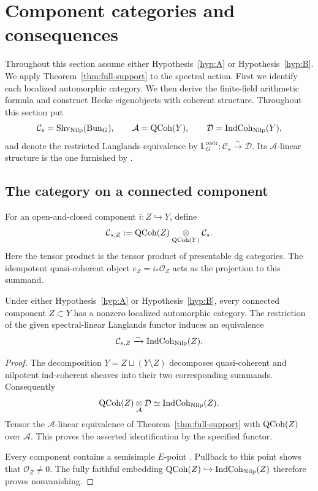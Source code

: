 \section{Component categories and consequences}
\label{sec:consequences}

Throughout this section assume either Hypothesis~\ref{hyp:A} or
Hypothesis~\ref{hyp:B}. We apply Theorem~\ref{thm:full-support} to the spectral action.
First we identify each localized automorphic category.  We then derive the
finite-field arithmetic formula and construct Hecke eigenobjects with
coherent structure.
Throughout this section put
\[
 \mathcal C_s=\operatorname{Shv}_{\operatorname{Nilp}}(\operatorname{Bun}_G),\qquad
 \mathcal A=\operatorname{QCoh}(Y),\qquad
 \mathcal D=\operatorname{IndCoh}_{\operatorname{Nilp}}(Y),
\]
and denote the restricted Langlands equivalence by
\(\mathbb L_G^{\mathrm{restr}}:\mathcal C_s\xrightarrow{\sim}\mathcal D\).
Its \(\mathcal A\)-linear structure is the one furnished by
\cite[Lemma~1.3.7]{GR}.

\subsection{The category on a connected component}

For an open-and-closed component \(i:Z\hookrightarrow Y\), define
\[
 \mathcal C_{s,Z}:=
 \operatorname{QCoh}(Z)\underset{\operatorname{QCoh}(Y)}\otimes\mathcal C_s.
\]
Here the tensor product is the tensor product of presentable dg categories.
The idempotent quasi-coherent object \(e_Z=i_*\mathcal O_Z\) acts as the
projection to this summand.

\begin{corollary}\label{cor:components}
Under either Hypothesis~\ref{hyp:A} or Hypothesis~\ref{hyp:B}, every
connected component \(Z\subset Y\) has a nonzero localized automorphic
category.  The restriction of the given spectral-linear Langlands functor
induces an equivalence
\[
 \mathcal C_{s,Z}\xrightarrow{\sim}\operatorname{IndCoh}_{\operatorname{Nilp}}(Z).
\]
\end{corollary}
\begin{proof}
The decomposition \(Y=Z\sqcup(Y\setminus Z)\) decomposes quasi-coherent
and nilpotent ind-coherent sheaves into their two corresponding summands.
Consequently
\[
 \operatorname{QCoh}(Z)\underset{\mathcal A}\otimes\mathcal D
 \simeq\operatorname{IndCoh}_{\operatorname{Nilp}}(Z).
\]
Tensor the \(\mathcal A\)-linear equivalence of
Theorem~\ref{thm:full-support} with \(\operatorname{QCoh}(Z)\) over \(\mathcal A\).
This proves the asserted identification by the specified functor.

Every component contains a semisimple \(E\)-point
\cite[Proposition~3.7.2 and Corollary~3.7.4]{AGKRRV}.
Pullback to this point shows that \(\mathcal O_Z\ne0\).
The fully faithful embedding
\(\operatorname{QCoh}(Z)\hookrightarrow\operatorname{IndCoh}_{\operatorname{Nilp}}(Z)\)
therefore proves nonvanishing.
\end{proof}

